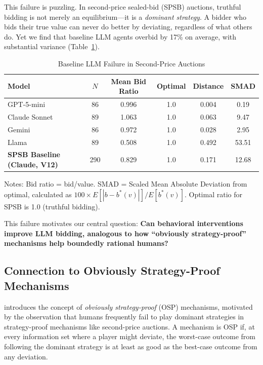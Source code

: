\documentclass[12pt]{article}
\begin{document}
This failure is puzzling. In second-price sealed-bid (SPSB) auctions, truthful bidding is not merely an equilibrium---it is a \emph{dominant strategy}. A bidder who bids their true value can never do better by deviating, regardless of what others do. Yet we find that baseline LLM agents overbid by 17\% on average, with substantial variance (Table~\ref{tab:baseline_failure}).

\begin{table}[h]
\centering
\caption{Baseline LLM Failure in Second-Price Auctions}
\label{tab:baseline_failure}
\begin{tabular}{lccccc}
\toprule
Model & $N$ & Mean Bid Ratio & Optimal & Distance & SMAD \\
\midrule
GPT-5-mini & 86 & 0.996 & 1.0 & 0.004 & 0.19 \\
Claude Sonnet & 89 & 1.063 & 1.0 & 0.063 & 9.47 \\
Gemini & 86 & 0.972 & 1.0 & 0.028 & 2.95 \\
Llama & 89 & 0.508 & 1.0 & 0.492 & 53.51 \\
\midrule
\textbf{SPSB Baseline (Claude, V12)} & 290 & 0.829 & 1.0 & 0.171 & 12.68 \\
\bottomrule
\end{tabular}
\smallskip
\begin{minipage}{0.9\textwidth}
\footnotesize
Notes: Bid ratio = bid/value. SMAD = Scaled Mean Absolute Deviation from optimal, calculated as $100 \times E[|b - b^*(v)|] / E[b^*(v)]$. Optimal ratio for SPSB is 1.0 (truthful bidding).
\end{minipage}
\end{table}

This failure motivates our central question: \textbf{Can behavioral interventions improve LLM bidding, analogous to how ``obviously strategy-proof'' mechanisms help boundedly rational humans?}

\subsection{Connection to Obviously Strategy-Proof Mechanisms}

\citet{li2017obviously} introduces the concept of \emph{obviously strategy-proof} (OSP) mechanisms, motivated by the observation that humans frequently fail to play dominant strategies in strategy-proof mechanisms like second-price auctions. A mechanism is OSP if, at every information set where a player might deviate, the worst-case outcome from following the dominant strategy is at least as good as the best-case outcome from any deviation.
\end{document}
